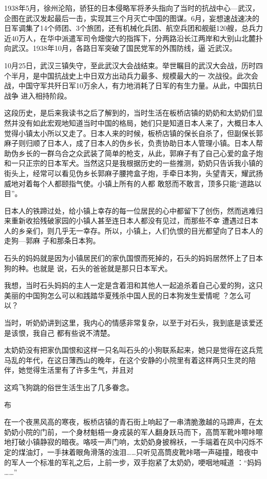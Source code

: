\documentclass{article}
\begin{document}
1938年5月，徐州沦陷，骄狂的日本侵略军将矛头指向了当时的抗战中心—武汉，企图在武汉发起最后一击，实现其三个月灭亡中国的图谋。6月，妄想速战速决的日军调集了14个师团、3个旅团，还有机械化兵团、航空兵团和舰艇120艘，总兵力近40万人，在华中派遣军司令畑俊六的指挥下，分两路沿长江两岸和大别山北麓扑向武汉。1938年10月，各路日军突破了国民党军的外围防线，逼
近武汉。 

10月25日，武汉三镇失守，至此武汉大会战结束。举世瞩目的武汉大会战，历时四个半月，是中国抗战史上中日双方出动兵力最多、规模最大的一
\newpage
次战役。此次会战，中国守军共歼日军10万余人，有力地消耗了日军的有生力量。从此，中国抗日战争
进入相持阶段。 

这段历史，是后来我读书之后了解到的，当时生活在板桥店镇的奶奶和太奶奶们显然并没有如此宏观地知道当时中国的格局，她们只是知道日本人来了，大概日本人觉得小镇太小所以又走了。日本人来的时候，板桥店镇的保长自杀了，但副保长郭麻子则归顺了日本人，成了日本人的伪乡长，负责协助日本人管理小镇。日本人帮助伪乡长的一群乌合之众武装了简单的枪支，从此，郭麻子有了自己心爱的盒子炮和一只正宗的日本军犬。当然这只是我根据历史的一些推测，奶奶只告诉我小镇的街头上，经常可以看见伪乡长郭麻子腰挎盒子炮，手牵日本狗，头望青天，耀武扬威地对着每个人都颐指气使。小镇上所有的人都
敢怒而不敢言，顶多只能“道路以目”。 

日本人的铁蹄过处，给小镇上幸存的每一位居民的心中都留下了创伤，然而逃难归来重新收拾残破家园的小镇人甚至连日本人都没有见过，而那些不幸
\newpage
遭遇过日本人的乡亲们，则几乎无一幸存。所以，小镇上，人们仇恨的目光都望向了日本人的走狗—郭麻
子和那条日本狗。 

石头的妈妈就是因为小镇居民们的家仇国恨而死掉的，石头的妈妈居然怀上了日本狗的种。也就是
说，石头的爸爸就是那只日本军犬。 

我想，当时石头妈妈的主人一定是含着泪和其他人一起追杀着自己心爱的狗，这只美丽的中国狗怎么可以和践踏华夏残杀中国人民的日本狗发生爱情呢
？怎么可以？ 

当时，听奶奶讲到这里，我内心的情感非常复杂，以至于对石头，我到底是该爱还是该恨，我自己
都有些说不清楚。 

太奶奶没有把家仇国恨和这样一只名叫石头的小狗联系起来，她只是觉得在这兵荒马乱的年代，在这日薄西山的晚年，在这个安静的小院里有着这样两只生灵的陪伴，她觉得生活里有了许多生气，并且对
\newpage

这鸡飞狗跳的俗世生活生出了几多眷念。 


布 

在一个夜黑风高的寒夜，板桥店镇的青石街上响起了一串清脆激越的马蹄声，在太奶奶小院的门前，一个身材魁梧一身戎装的军人翻身跃马而下，高筒军靴咔嚓咔嚓地打破小镇静寂的暗夜。咯吱一声门响，太奶奶身披棉袄，一手端着在风中闪烁不定的煤油灯，一手抹着眼角滑落的浊泪……只听见高筒皮靴咔嗒一声碰撞，暗夜中的军人一个标准的军礼之后，上前一步，双手抱紧了太奶奶，哽咽地喊道 ：“妈妈
……” 
\end{document}
